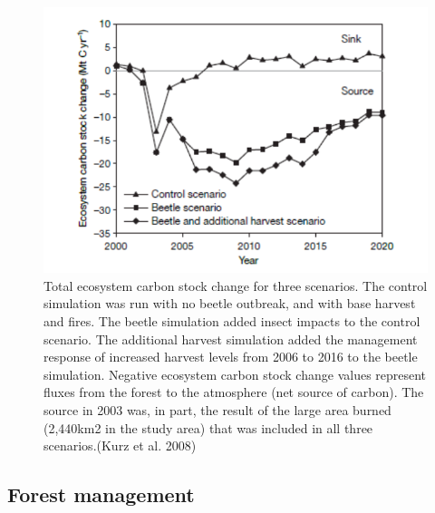 \documentclass[
  12pt,
  oneside]{book}
\begin{document}
\begin{figure}

{\centering \includegraphics[width=0.8\linewidth]{figures/chap8/f812_Kurz3} 

}

\caption{Total ecosystem carbon stock change for three scenarios. The control simulation was run with no beetle outbreak, and with base harvest and fires. The beetle simulation added insect impacts to the control scenario. The additional harvest simulation added the management response of increased harvest levels from 2006 to 2016 to the beetle simulation. Negative ecosystem carbon stock change values represent fluxes from the forest to the atmosphere (net source of carbon). The source in 2003 was, in part, the result of the large area burned (2,440km2 in the study area) that was included in all three scenarios.(Kurz et al. 2008)}\label{fig:f812}
\end{figure}

\hypertarget{forest-management}{%
\subsection{Forest management}\label{forest-management}}
\end{document}
